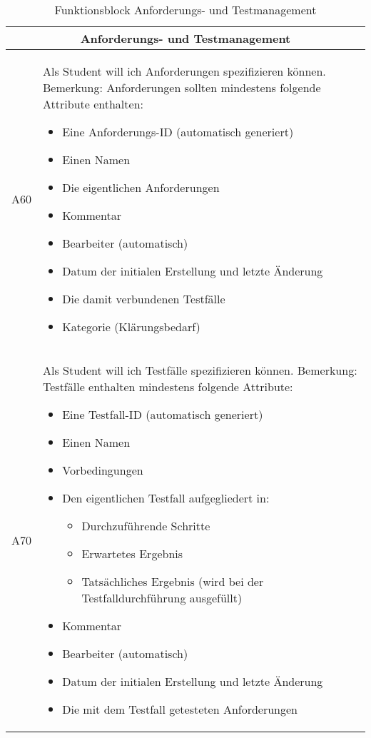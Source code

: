 \documentclass[11pt,a4paper]{report}
\begin{document}
\begin{table}[htpb]
\caption{Funktionsblock Anforderungs- und Testmanagement}
\begin{center}
\begin{tabular}{|p{}|p{}|}
  \hline

    \multicolumn{2}{|c|}{Anforderungs- und Testmanagement}\\
    \hline
        A60 &  Als Student will ich Anforderungen spezifizieren können.
Bemerkung: Anforderungen sollten mindestens folgende Attribute enthalten:
\begin{itemize}
\setlength\itemsep{0.1em}
\item Eine Anforderungs-ID (automatisch generiert)
\item Einen Namen
\item Die eigentlichen Anforderungen
\item Kommentar
\item Bearbeiter (automatisch)
\item Datum der initialen Erstellung und letzte Änderung
\item Die damit verbundenen Testfälle
\item Kategorie (Klärungsbedarf)

\end{itemize} \\
\hline
           A70 & Als Student will ich Testfälle spezifizieren können.
Bemerkung: Testfälle enthalten mindestens folgende Attribute:
\begin{itemize}
\setlength\itemsep{0.1em}
\item Eine Testfall-ID (automatisch generiert)
\item Einen Namen
\item Vorbedingungen
\item Den eigentlichen Testfall aufgegliedert in:
\begin{itemize}
\setlength\itemsep{0.1em}
\item Durchzuführende Schritte
\item Erwartetes Ergebnis
\item Tatsächliches Ergebnis (wird bei der Testfalldurchführung ausgefüllt)

\end{itemize}
\item Kommentar
\item Bearbeiter (automatisch)
\item Datum der initialen Erstellung und letzte Änderung
\item Die mit dem Testfall getesteten Anforderungen



\end{itemize}
\end{tabular}
\end{center}
\end{table}
\end{document}
